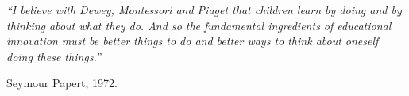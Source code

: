 \begin{epigrafe}
    \vspace*{\fill}
	\begin{flushright}
		\textit{``I believe with Dewey, Montessori and Piaget that children learn by doing and by thinking about what they do. And so the fundamental ingredients of educational innovation must be better things to do and better ways to think about oneself doing these things.''}
		
		Seymour Papert, 1972.
	\end{flushright}
\end{epigrafe}